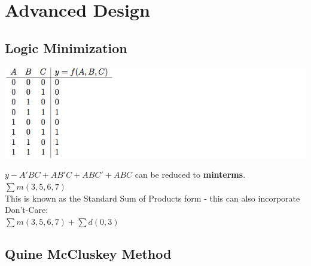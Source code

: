 \documentclass[11pt]{article}
\begin{document}
    \pagebreak
    \section{Advanced Design}
    \subsection{Logic Minimization}
    \begin{center}
        \includegraphics[width=300 px]{logic} 
    \end{center} 
    $y - A'BC + AB'C + ABC' + ABC$ can be reduced to \textbf{minterms}. \\ 

    $\sum m(3,5,6,7)$ \\
    
    This is known as the Standard Sum of Products form - this can also incorporate Don't-Care: \\
    
    $\sum m(3,5,6,7) + \sum d(0,3)$

    \subsection{Quine McCluskey Method}
\end{document}
